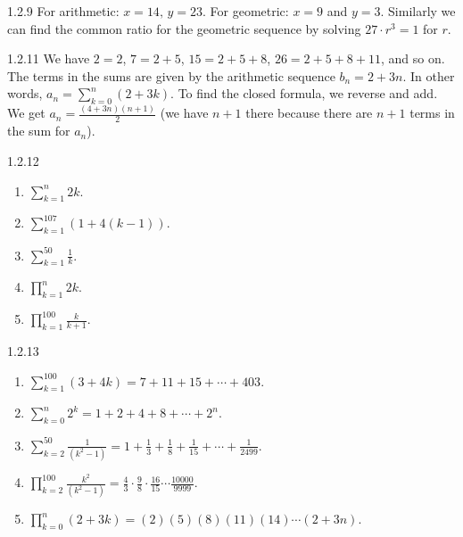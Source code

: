 \documentclass[11pt,]{book}
\theoremstyle{ptxplainnotitle}
\theoremstyle{ptxplaintitle}
\theoremstyle{ptxdefinitionnotitle}
\theoremstyle{ptxdefinitiontitle}
\theoremstyle{ptxdefinitionnotitle}
\theoremstyle{ptxdefinitiontitle}
\theoremstyle{ptxdefinitionnotitle}
\theoremstyle{ptxdefinitiontitle}
\theoremstyle{ptxdefinitiontitlenonumber}
\theoremstyle{ptxdefinitiontitlenonumber}
\numberwithin{equation}{chapter}
\renewcommand{\d}{\displaystyle}
\begin{document}
\begin{divisionexercise}{1.2.9}
\textbf{}\hypertarget{p-316}{}%
For arithmetic: \(x = 14\text{,}\) \(y = 23\text{.}\) For geometric: \(x = 9\) and \(y = 3\text{.}\)    Similarly we can find the common ratio for the geometric sequence by solving \(27\cdot r^3 = 1\) for \(r\text{.}\)%
\end{divisionexercise}%
\begin{divisionexercise}{1.2.11}
\textbf{}\hypertarget{p-319}{}%
We have \(2 = 2\), \(7 = 2+5\), \(15 = 2 + 5 + 8\), \(26 = 2+5+8+11\), and so on. The terms in the sums are given by the arithmetic sequence \(b_n = 2+3n\). In other words, \(a_n = \sum_{k=0}^n (2+3k)\). To find the closed formula, we reverse and add. We get \(a_n = \frac{(4+3n)(n+1)}{2}\) (we have \(n+1\) there because there are \(n+1\) terms in the sum for \(a_n\)).%
\end{divisionexercise}%
\begin{divisionexercise}{1.2.12}
\textbf{}\hypertarget{p-321}{}%
\leavevmode%
\begin{enumerate}[label=(\alph*)]
\item\hypertarget{li-169}{}\(\d\sum_{k=1}^n 2k\).%
\item\hypertarget{li-170}{}\(\d\sum_{k=1}^{107} (1 + 4(k-1))\).%
\item\hypertarget{li-171}{}\(\d\sum_{k=1}^{50} \frac{1}{k}\).%
\item\hypertarget{li-172}{}\(\d\prod_{k=1}^n 2k\).%
\item\hypertarget{li-173}{}\(\d\prod_{k=1}^{100} \frac{k}{k+1}\).%
\end{enumerate}
%
\end{divisionexercise}%
\begin{divisionexercise}{1.2.13}
\textbf{}\hypertarget{p-323}{}%
\leavevmode%
\begin{enumerate}[label=(\alph*)]
\item\hypertarget{li-179}{}\(\d\sum_{k=1}^{100} (3+4k) = 7 + 11 + 15 + \cdots + 403\).%
\item\hypertarget{li-180}{}\(\d\sum_{k=0}^n 2^k = 1 + 2 + 4 + 8 + \cdots + 2^n\).%
\item\hypertarget{li-181}{}\(\d\sum_{k=2}^{50}\frac{1}{(k^2 - 1)} = 1 + \frac{1}{3} + \frac{1}{8} + \frac{1}{15} + \cdots + \frac{1}{2499}\).%
\item\hypertarget{li-182}{}\(\d\prod_{k=2}^{100}\frac{k^2}{(k^2-1)} = \frac{4}{3}\cdot\frac{9}{8}\cdot\frac{16}{15}\cdots\frac{10000}{9999}\).%
\item\hypertarget{li-183}{}\(\d\prod_{k=0}^n (2+3k) = (2)(5)(8)(11)(14)\cdots(2+3n)\).%
\end{enumerate}
%
\end{divisionexercise}%
\end{document}
